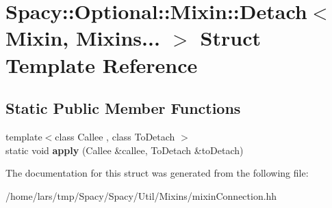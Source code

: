 \hypertarget{structSpacy_1_1Optional_1_1Mixin_1_1Detach_3_01Mixin_00_01Mixins_8_8_8_01_4}{}\section{Spacy\+:\+:Optional\+:\+:Mixin\+:\+:Detach$<$ Mixin, Mixins... $>$ Struct Template Reference}
\label{structSpacy_1_1Optional_1_1Mixin_1_1Detach_3_01Mixin_00_01Mixins_8_8_8_01_4}
\subsection*{Static Public Member Functions}
\begin{DoxyCompactItemize}
\item 
{\footnotesize template$<$class Callee , class To\+Detach $>$ }\\static void {\bfseries apply} (Callee \&callee, To\+Detach \&to\+Detach)\hypertarget{structSpacy_1_1Optional_1_1Mixin_1_1Detach_3_01Mixin_00_01Mixins_8_8_8_01_4_ac1965d8b405371ea78bd2d29e2f6891f}{}\label{structSpacy_1_1Optional_1_1Mixin_1_1Detach_3_01Mixin_00_01Mixins_8_8_8_01_4_ac1965d8b405371ea78bd2d29e2f6891f}

\end{DoxyCompactItemize}


The documentation for this struct was generated from the following file\+:\begin{DoxyCompactItemize}
\item 
/home/lars/tmp/\+Spacy/\+Spacy/\+Util/\+Mixins/mixin\+Connection.\+hh\end{DoxyCompactItemize}

